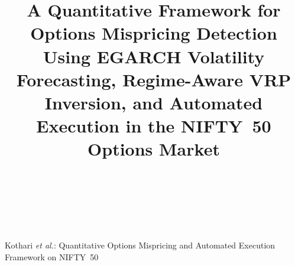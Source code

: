 \documentclass[journal]{IEEEtran}
\begin{document}
\title{A Quantitative Framework for Options Mispricing Detection Using EGARCH Volatility Forecasting, Regime-Aware VRP Inversion, and Automated Execution in the NIFTY~50 Options Market}

\author{
\begin{minipage}[t]{0.48\linewidth}
\centering
{}\\
\end{minipage}\hfill
\begin{minipage}[t]{0.48\linewidth}
\centering
{}\\
\end{minipage}
}

\markboth{}%
{Kothari \MakeLowercase{\textit{et al.}}: Quantitative Options Mispricing and Automated Execution Framework on NIFTY~50}

\maketitle
\end{document}
